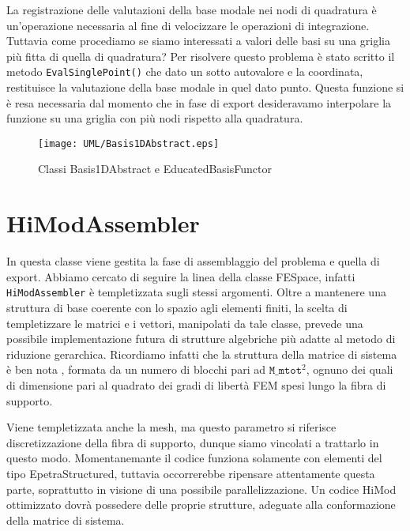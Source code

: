 La registrazione delle valutazioni della base modale nei nodi di quadratura \`e un'operazione necessaria al fine di velocizzare le operazioni di integrazione. Tuttavia come procediamo se siamo interessati a valori delle basi su una griglia pi\`u fitta di quella di quadratura? Per risolvere questo problema \`e stato scritto il metodo \texttt{EvalSinglePoint()} che dato un sotto autovalore e la coordinata, restituisce la valutazione della base modale in quel dato punto. Questa funzione si \`e resa necessaria dal momento che in fase di export desideravamo interpolare la funzione su una griglia con pi\`u nodi rispetto alla quadratura.

\begin{figure}[!htbp]
        \centering%
          {\label{fig: slice9}\texttt{[image: UML/Basis1DAbstract.eps]}}\qquad
        \caption{Classi Basis1DAbstract e EducatedBasisFunctor}
        \label{fig: UMLBasis}
\end{figure}

\section{HiModAssembler}
 
 In questa classe viene gestita la fase di assemblaggio del problema e quella di export. Abbiamo cercato di seguire la linea della classe FESpace, infatti \texttt{HiModAssembler} \`e templetizzata sugli stessi argomenti. Oltre a mantenere una struttura di base coerente con lo spazio agli elementi finiti, la scelta di templetizzare le matrici e i vettori, manipolati da tale classe, prevede una possibile implementazione futura di strutture algebriche pi\`u adatte al metodo di riduzione gerarchica. Ricordiamo infatti che la struttura della matrice di sistema \`e ben nota  , formata da un numero di blocchi pari ad $\texttt{M\_mtot}^2$, ognuno dei quali di dimensione pari al quadrato dei gradi di libert\`a FEM spesi lungo la fibra di supporto.
 

 
 Viene templetizzata anche la mesh, ma questo parametro si riferisce discretizzazione della fibra di supporto, dunque siamo vincolati a trattarlo in questo modo.
 Momentanemante il codice funziona solamente con elementi del tipo EpetraStructured, tuttavia occorrerebbe ripensare attentamente questa parte, soprattutto in visione di una possibile parallelizzazione.
Un codice HiMod ottimizzato dovr\`a possedere delle proprie strutture, adeguate alla conformazione della matrice di sistema.

